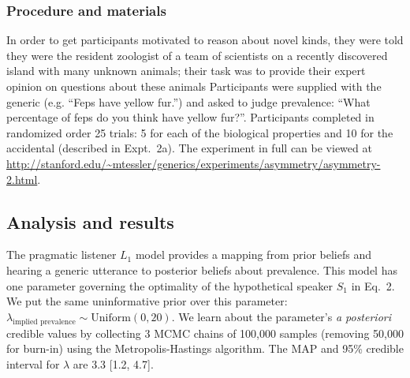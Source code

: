 \documentclass[12pt,letterpaper]{article}
\begin{document}
\subsubsection*{Procedure and materials}

In order to get participants motivated to reason about novel kinds, they were told they were the resident zoologist of a team of scientists on a recently discovered island with many unknown animals; their task was to provide their expert opinion on questions about these animals
Participants were supplied with the generic (e.g. ``Feps have yellow fur.'') and asked to judge prevalence: ``What percentage of feps do you think have yellow fur?''. 
Participants completed in randomized order 25 trials: 5 for each of the biological properties and 10 for the accidental (described in Expt.~2a).
The experiment in full can be viewed at \url{http://stanford.edu/~mtessler/generics/experiments/asymmetry/asymmetry-2.html}. 

\subsection*{Analysis and results}

The pragmatic listener $L_1$ model provides a mapping from prior beliefs and hearing a generic utterance to posterior beliefs about prevalence.
This model has one parameter governing the optimality of the hypothetical speaker $S_1$ in Eq.~2. 
We put the same uninformative prior over this parameter: $\lambda_{\text{implied prevalence}} \sim \text{Uniform}(0, 20)$.
We learn about the parameter's \emph{a posteriori} credible values by collecting 3 MCMC chains of 100,000 samples (removing 50,000 for burn-in) using the Metropolis-Hastings algorithm.
The MAP and 95\% credible interval for $\lambda$ are 3.3 [1.2, 4.7].
\end{document}

